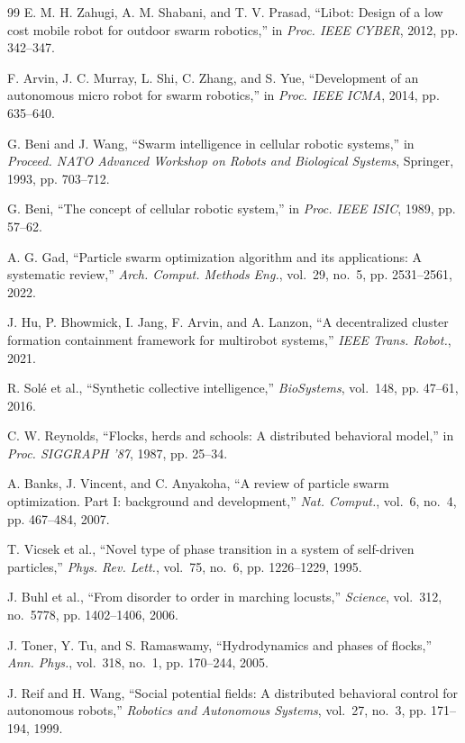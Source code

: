 \documentclass[journal,twoside]{IEEEtran}
\begin{document}
\begin{thebibliography}{99}
E. M. H. Zahugi, A. M. Shabani, and T. V. Prasad, ``Libot: Design of a low cost mobile robot for outdoor swarm robotics,'' in \emph{Proc. IEEE CYBER}, 2012, pp. 342--347.

F. Arvin, J. C. Murray, L. Shi, C. Zhang, and S. Yue, ``Development of an autonomous micro robot for swarm robotics,'' in \emph{Proc. IEEE ICMA}, 2014, pp. 635--640.

G. Beni and J. Wang, ``Swarm intelligence in cellular robotic systems,'' in \emph{Proceed. NATO Advanced Workshop on Robots and Biological Systems}, Springer, 1993, pp. 703--712.

G. Beni, ``The concept of cellular robotic system,'' in \emph{Proc. IEEE ISIC}, 1989, pp. 57--62.

A. G. Gad, ``Particle swarm optimization algorithm and its applications: A systematic review,'' \emph{Arch. Comput. Methods Eng.}, vol.~29, no.~5, pp. 2531--2561, 2022.

J. Hu, P. Bhowmick, I. Jang, F. Arvin, and A. Lanzon, ``A decentralized cluster formation containment framework for multirobot systems,'' \emph{IEEE Trans. Robot.}, 2021.

R. Solé et al., ``Synthetic collective intelligence,'' \emph{BioSystems}, vol.~148, pp. 47--61, 2016.

C. W. Reynolds, ``Flocks, herds and schools: A distributed behavioral model,'' in \emph{Proc. SIGGRAPH '87}, 1987, pp. 25--34.

A. Banks, J. Vincent, and C. Anyakoha, ``A review of particle swarm optimization. Part I: background and development,'' \emph{Nat. Comput.}, vol.~6, no.~4, pp. 467--484, 2007.

T. Vicsek et al., ``Novel type of phase transition in a system of self-driven particles,'' \emph{Phys. Rev. Lett.}, vol.~75, no.~6, pp. 1226--1229, 1995.

J. Buhl et al., ``From disorder to order in marching locusts,'' \emph{Science}, vol.~312, no.~5778, pp. 1402--1406, 2006.

J. Toner, Y. Tu, and S. Ramaswamy, ``Hydrodynamics and phases of flocks,'' \emph{Ann. Phys.}, vol.~318, no.~1, pp. 170--244, 2005.

J. Reif and H. Wang, ``Social potential fields: A distributed behavioral control for autonomous robots,'' \emph{Robotics and Autonomous Systems}, vol.~27, no.~3, pp. 171--194, 1999.


\end{thebibliography}
\end{document}

